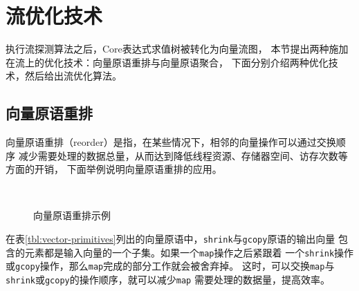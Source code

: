 \section{流优化技术}\label{sec:stream-optimization}
执行流探测算法之后，Core表达式求值树被转化为向量流图，
本节提出两种施加在流上的优化技术：向量原语重排与向量原语聚合，
下面分别介绍两种优化技术，然后给出流优化算法。

\subsection{向量原语重排}
向量原语重排（reorder）是指，在某些情况下，相邻的向量操作可以通过交换顺序
减少需要处理的数据总量，从而达到降低线程资源、存储器空间、访存次数等方面的开销，
下面举例说明向量原语重排的应用。
\begin{quotation}
\end{quotation}
\begin{figure}
  \centering
  \\
  \caption{向量原语重排示例}
  \label{fig:vp-reorder}
\end{figure}

在表\ref{tbl:vector-primitives}列出的向量原语中，\texttt{shrink}与\texttt{gcopy}原语的输出向量
包含的元素都是输入向量的一个子集。如果一个\texttt{map}操作之后紧跟着
一个\texttt{shrink}操作或\texttt{gcopy}操作，那么\texttt{map}完成的部分工作就会被舍弃掉。
这时，可以交换\texttt{map}与\texttt{shrink}或\texttt{gcopy}的操作顺序，就可以减少\texttt{map}
需要处理的数据量，提高效率。

